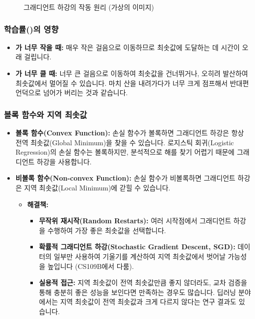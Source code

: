 \documentclass[11pt,a4paper]{book}
\theoremstyle{definition}
\begin{document}
\begin{figure}[h!]
    \centering
    \caption{그래디언트 하강의 작동 원리 (가상의 이미지)}
    \label{fig:gradient_descent}
\end{figure}

\subsubsection{학습률(\texttt{\eta})의 영향}
\begin{itemize}
    \item \textbf{\texttt{\eta}가 너무 작을 때:} 매우 작은 걸음으로 이동하므로 최솟값에 도달하는 데 시간이 오래 걸립니다.
    \item \textbf{\texttt{\eta}가 너무 클 때:} 너무 큰 걸음으로 이동하여 최솟값을 건너뛰거나, 오히려 발산하여 최솟값에서 멀어질 수 있습니다. 마치 산을 내려가다가 너무 크게 점프해서 반대편 언덕으로 넘어가 버리는 것과 같습니다.
\end{itemize}

\subsubsection{볼록 함수와 지역 최솟값}
\begin{itemize}
    \item \textbf{볼록 함수(Convex Function):} 손실 함수가 볼록하면 그래디언트 하강은 항상 전역 최솟값(Global Minimum)을 찾을 수 있습니다. 로지스틱 회귀(Logistic Regression)의 손실 함수는 볼록하지만, 분석적으로 해를 찾기 어렵기 때문에 그래디언트 하강을 사용합니다.
    \item \textbf{비볼록 함수(Non-convex Function):} 손실 함수가 비볼록하면 그래디언트 하강은 지역 최솟값(Local Minimum)에 갇힐 수 있습니다.
        \begin{itemize}
            \item \textbf{해결책:}
                \begin{itemize}
                    \item \textbf{무작위 재시작(Random Restarts):} 여러 시작점에서 그래디언트 하강을 수행하여 가장 좋은 최솟값을 선택합니다.
                    \item \textbf{확률적 그래디언트 하강(Stochastic Gradient Descent, SGD):} 데이터의 일부만 사용하여 기울기를 계산하여 지역 최솟값에서 벗어날 가능성을 높입니다 (CS109B에서 다룸).
                    \item \textbf{실용적 접근:} 지역 최솟값이 전역 최솟값만큼 좋지 않더라도, 교차 검증을 통해 충분히 좋은 성능을 보인다면 만족하는 경우도 많습니다. 딥러닝 분야에서는 지역 최솟값이 전역 최솟값과 크게 다르지 않다는 연구 결과도 있습니다.
                \end{itemize}
        \end{itemize}
\end{itemize}
\end{document}
